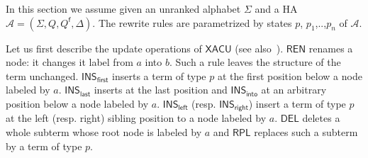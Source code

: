 \documentclass[a4paper]{article}
\theoremstyle{plain}
\newcommand{\F}{\Sigma}
\newcommand{\A}{\mathcal{A}}
\newcommand{\final}{\mathsf{f}}
\newcommand{\XACU}{\textsf{XACU}}
\newcommand{\INS}{\mathsf{INS}}
\newcommand{\REN}{\mathsf{REN}}
\newcommand{\RPL}{\mathsf{RPL}}
\newcommand{\DEL}{\mathsf{DEL}}
\begin{document}
In this section we assume given an unranked alphabet $\F$ and
a HA $\A = (\F, Q, Q^\final, \Delta)$.
The rewrite rules are parametrized by
states $p$, $p_1$,..,$p_n$ of $\A$.

\medskip\noindent{\bf $\XACU$ rules.}
Let us first describe the update operations of $\XACU$ (see also~\cite{FundulakiManeth07}).
$\REN$ renames a node: it changes it label from $a$ into $b$.
Such a rule leaves the structure of the term unchanged.
$\INS_\mathsf{first}$ inserts a term of type $p$ at the first position
below a node labeled by $a$.
$\INS_\mathsf{last}$ inserts at the last position and
$\INS_\mathsf{into}$ at an arbitrary position below a node labeled by $a$.
$\INS_\mathsf{left}$ (resp. $\INS_\mathsf{right}$) insert a term of
type $p$ at the left (resp. right) sibling position to a node labeled by $a$.
$\DEL$ deletes a whole subterm whose root node is labeled by $a$
and $\RPL$ replaces such a subterm by a term of type $p$.
\end{document}
